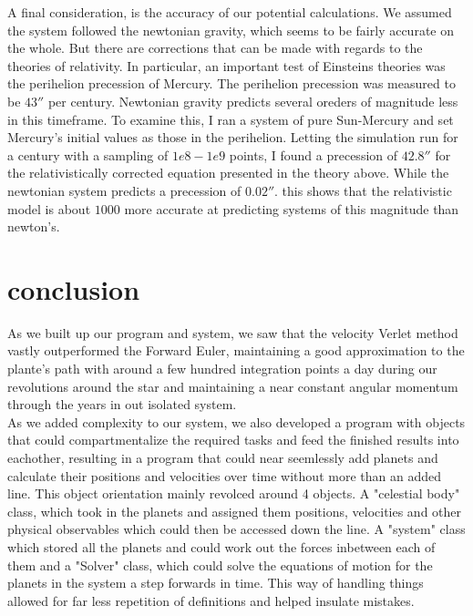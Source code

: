 \documentclass[10pt, twocolumn]{revtex4-1}
\begin{document}
A final consideration, is the accuracy of our potential calculations. We assumed the system followed the newtonian gravity, which seems 
to be fairly accurate on the whole. But there are corrections that can be made with regards to the theories of relativity. In particular, 
an important test of Einsteins theories was the perihelion precession of Mercury. The perihelion precession was measured to be $43''$ per century.
Newtonian gravity predicts several oreders of magnitude less in this timeframe. To examine this, I ran a system of pure Sun-Mercury and set Mercury's 
initial values as those in the perihelion. Letting the simulation run for a century with a sampling of $1e8-1e9$ points, I found a precession of 
$42.8''$ for the relativistically corrected equation presented in the theory above. While the newtonian system predicts a precession of $0.02''$.
this shows that the relativistic model is about $1 000$ more accurate at predicting systems of this magnitude than newton's. 

\section{conclusion}
As we built up our program and system, we saw that the velocity Verlet method vastly outperformed the Forward Euler, maintaining a good approximation
to the plante's path with around a few hundred integration points a day during our revolutions around the star and maintaining a near constant angular
momentum through the years in out isolated system. \\

As we added complexity to our system, we also developed a program with objects that could 
compartmentalize the required tasks and feed the finished results into eachother, resulting in a program that could near seemlessly add planets and 
calculate their positions and velocities over time without more than an added line. This object orientation mainly revolced around 4 objects. A "celestial 
body" class, which took in the planets and assigned them positions, velocities and other physical observables which could then be accessed down the line. 
A "system" class which stored all the planets and could work out the forces inbetween each of them and a "Solver" class, which could solve the equations of 
motion for the planets in the system a step forwards in time. This way of handling things allowed for far less repetition of definitions and helped insulate
mistakes.\\
\end{document}
